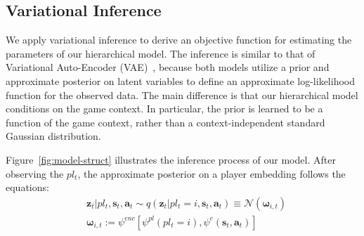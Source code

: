 \documentclass{article}
\newcommand{\context}{c}
\newcommand{\latentvariables}{\mathbf{z}}
\newcommand{\inference}{q}
\newcommand{\generation}{p}
\newcommand{\state}{\mathbf{s}}
\newcommand{\action}{\mathbf{a}}
\newcommand{\player}{pl}
\newcommand{\pindex}{i}
\newcommand{\GaussianParameters}{\boldsymbol{\omega}}
\begin{document}


\subsection{Variational Inference}


We apply variational inference to derive an objective function for estimating the parameters of our hierarchical model. The inference is similar to that of Variational Auto-Encoder (VAE)~\cite{kingma2013auto}, because both models utilize a prior and approximate posterior on latent variables to define an approximate log-likelihood function for the observed data. 
The main difference is that our hierarchical model conditions on the game context. In particular, the prior is learned to be a function of the game context, rather than a context-independent standard Gaussian distribution.

Figure~\ref{fig:model-struct} illustrates the inference process of our model. After observing the $\player_{t}$, the approximate posterior on a player embedding follows the equations:
\vspace{-0.03in}
\begin{align}
& \latentvariables_{t}|\player_{t} ,\state_{t},\action_{t} \sim \inference(\latentvariables_{t} |\player_{t} = \pindex,\state_{t},\action_{t}) \equiv \mathcal{N}(\boldsymbol{\GaussianParameters}_{\pindex,t})\label{eqn:approximate-posterior}\\
& \boldsymbol{\GaussianParameters}_{\pindex,t}:=\psi^{enc}[\psi^{\player}(\player_{t}=\pindex),\psi^{\context}(\state_{t},\action_{t})]
\end{align}

\end{document}
